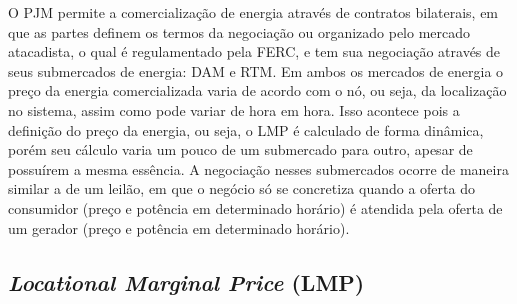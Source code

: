 O PJM permite a comercialização de energia através de contratos bilaterais, em que as partes definem os termos da negociação ou organizado pelo mercado atacadista, o qual é regulamentado pela \ac{FERC}, e tem sua negociação através de seus submercados de energia: \ac{DAM} e \ac{RTM}. 
Em ambos os mercados de energia o preço da energia comercializada varia de acordo com o nó, ou seja, da localização no sistema, assim como pode variar de hora em hora. Isso acontece pois a definição do preço da energia, ou seja, o \ac{LMP} é calculado de forma dinâmica, porém seu cálculo varia um pouco de um submercado para outro, apesar de possuírem a mesma essência. A negociação nesses submercados ocorre de maneira similar a de um leilão, em que o negócio só se concretiza quando a oferta do consumidor (preço e potência em determinado horário) é atendida pela oferta de um gerador (preço e potência em determinado horário).

\subsection{\textit{Locational Marginal Price} (LMP)}

